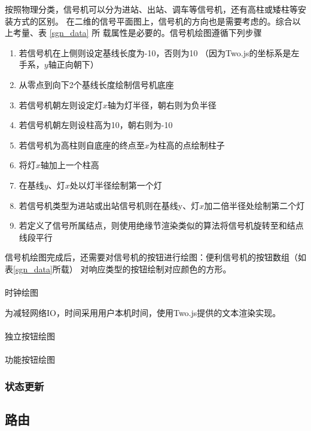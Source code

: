 按照物理分类，信号机可以分为进站、出站、调车等信号机，还有高柱或矮柱等安装方式的区别。
在二维的信号平面图上，信号机的方向也是需要考虑的。综合以上考量、表 \ref{sgn_data} 所
载属性是必要的。信号机绘图遵循下列步骤
\begin{enumerate}[\indent i.]
    \item 若信号机在上侧则设定基线长度为-10，否则为10 （因为Two.js的坐标系是左手系，$y$轴正向朝下）
    \item 从零点到向下2个基线长度绘制信号机底座
    \item 若信号机朝左则设定灯$x$轴为灯半径，朝右则为负半径
    \item 若信号机朝左则设柱高为10，朝右则为-10
    \item 若信号机为高柱则自底座的终点至$x$为柱高的点绘制柱子
    \item 将灯$x$轴加上一个柱高
    \item 在基线$y$、灯$x$处以灯半径绘制第一个灯
    \item 若信号机类型为进站或出站信号机则在基线y、灯$x$加二倍半径处绘制第二个灯
    \item 若定义了信号所属结点，则使用绝缘节渲染类似的算法将信号机旋转至和结点线段平行
\end{enumerate}

信号机绘图完成后，还需要对信号机的按钮进行绘图：便利信号机的按钮数组（如表\ref{sgn_data}所载）
对响应类型的按钮绘制对应颜色的方形。

\paragraph{}时钟绘图

为减轻网络IO，时间采用用户本机时间，使用Two.js提供的文本渲染实现。

\paragraph{}独立按钮绘图
\paragraph{}功能按钮绘图

\subsubsection{状态更新}

\subsection{路由}

